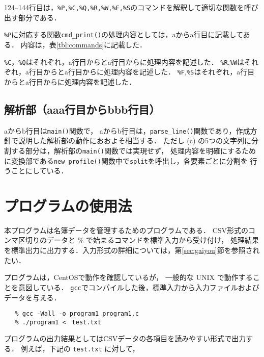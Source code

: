 \documentclass[a4j,11pt]{jarticle}
\begin{document}
124--144行目は，\verb|%P,%C,%Q,%R,%W,%F,%S|のコマンドを解釈して適切な関数を呼び出す部分である．

\verb|%P|に対応する関数\verb|cmd_print()|の処理内容としては，aからa行目に記載してある．
内容は，表\ref{tbl:commands}に記載した．

\verb|%C|，\verb|%Q|はそれぞれ，a行目からとa行目からに処理内容を記述した．
\verb|%R|,\verb|%W|はそれぞれ，a行目からとa行目からに処理内容を記述した．
\verb|%F|,\verb|%S|はそれぞれ，a行目からとa行目からに処理内容を記述した．

\subsection{解析部（aaa行目からbbb行目）}
aからb行目は\verb|main()|関数で，
aからb行目は，\verb|parse_line()|関数であり，作成方針で説明した解析部の動作におおよそ相当する．
ただし (c) の5つの文字列に分割する部分は，解析部の\verb|main()|関数では実現せず，
処理内容を明確にするために変換部である\verb|new_profile()|関数中で\verb|split|を呼出し，各要素ごとに分割を
行うことにしている．

\section{プログラムの使用法}\label{sec:use}

本プログラムは名簿データを管理するためのプログラムである．
CSV形式のコンマ区切りのデータと \% で始まるコマンドを標準入力から受け付け，
処理結果を標準出力に出力する．入力形式の詳細については，第\ref{sec:gaiyou}節を参照されたい．

プログラムは，CentOSで動作を確認しているが，
一般的な UNIX で動作することを意図している．
\verb|gcc|でコンパイルした後，標準入力から入力ファイルおよびデータを与える．

{\fontsize{10pt}{11pt} \selectfont
 \begin{verbatim}
   % gcc -Wall -o program1 program1.c
   % ./program1 <　test.txt
 \end{verbatim}
}
プログラムの出力結果としてはCSVデータの各項目を読みやすい形式で出力する．
例えば，下記の \verb|test.txt| に対して，
\end{document}

